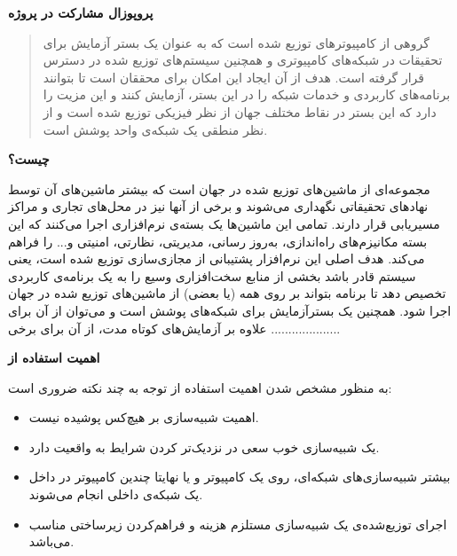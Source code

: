 \documentclass[11pt]{article}
\begin{document}
\thispagestyle{empty}

\bigskip
\bigskip

\centerline{\textbf{\Large{پروپوزال مشارکت در پروژه }}}

\bigskip
\bigskip



\bigskip


\bigskip 

\begin{abstract}
 گروهی از کامپیوتر‌های توزیع شده است که به عنوان یک بستر آزمایش برای تحقیقات در شبکه‌های کامپیوتری و همچنین سیستم‌های توزیع شده در دسترس قرار گرفته است. هدف از آن ایجاد این امکان برای محققان است تا بتوانند برنامه‌های کاربردی و خدمات شبکه را در این بستر، آزمایش کنند و این مزیت را دارد که این بستر در نقاط مختلف جهان از نظر فیزیکی توزیع شده است و از نظر منطقی یک شبکه‌ی واحد پوشش است.

\end{abstract}

\bigskip

\noindent\textbf{ چیست؟}

 مجموعه‌ای از ماشین‌های توزیع شده در جهان است که بیشتر ماشین‌های آن توسط نهادهای تحقیقاتی نگهداری می‌شوند و برخی از آنها نیز در محل‌های تجاری و مراکز مسیریابی قرار دارند. تمامی این ماشین‌ها یک بسته‌ی نرم‌افزاری اجرا می‌کنند که این بسته مکانیزم‌های راه‌اندازی، به‌روز رسانی، مدیریتی، نظارتی، امنیتی و... را فراهم می‌کند. هدف اصلی این نرم‌افزار پشتیبانی از مجازی‌سازی توزیع شده است، یعنی سیستم قادر باشد بخشی از منابع سخت‌افزاری وسیع  را به یک برنامه‌ی کاربردی تخصیص دهد تا برنامه بتواند بر روی همه (یا بعضی) از ماشین‌های توزیع شده در جهان اجرا شود.
همچنین یک بسترآزمایش برای شبکه‌های پوشش است و می‌توان از آن برای ....................
علاوه بر آزمایش‌های کوتاه مدت، از آن برای برخی 
\bigskip

\noindent\textbf{اهمیت استفاده از }

به منظور مشخص شدن اهمیت استفاده از  توجه به چند نکته ضروری است:
\begin{itemize}
	\item
	اهمیت شبیه‌سازی بر هیچ‌کس پوشیده نیست.
	\item
	یک شبیه‌سازی خوب سعی در نزدیک‌تر کردن شرایط به واقعیت دارد.
	\item
	بیشتر شبیه‌سازی‌های شبکه‌ای، روی یک کامپیوتر و یا نهایتا چندین کامپیوتر در داخل یک شبکه‌ی داخلی انجام می‌شوند.
	\item
	اجرای توزیع‌شده‌ی یک شبیه‌سازی مستلزم هزینه‌ و فراهم‌کردن زیرساختی مناسب می‌باشد.
\end{itemize}
\end{document}
